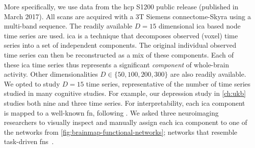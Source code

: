 More specifically, we use data from the \gls{hcp} S1200 public release (published in March 2017).
All scans are acquired with a 3T Siemens connectome-Skyra using a multi-band sequence.
The readily available $D = 15$ dimensional \gls{ica} based node time series are used.
\Gls{ica} is a technique that decomposes observed (voxel) time series into a set of independent components.
The original individual observed time series can then be reconstructed as a mix of these components.
Each of these \gls{ica} time series thus represents a significant \emph{component} of whole-brain activity.
Other dimensionalities $D \in \{50,100,200,300\}$ are also readily available.
We opted to study $D = 15$ time series, representative of the number of time series studied in many cognitive studies.
For example, our depression study in \cref{ch:ukb} studies both nine and three time series.
%
For interpretability, each \gls{ica} component is mapped to a well-known \gls{fn}, following \textcite{Giorgio2018}.
We asked three neuroimaging researchers to visually inspect and manually assign each \gls{ica} component to one of the networks from \cref{fig:brainmap-functional-networks}; networks that resemble task-driven \glspl{fn}~\parencite{Fox2007, Smith2009}.


\captionsetup[subfigure]{labelformat=empty}

